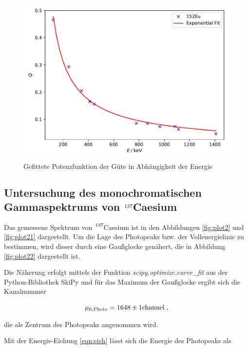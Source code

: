 \begin{figure}[H]
  \centering
  \includegraphics[scale=0.7]{content/plot6.pdf}
  \caption{Gefittete Potenzfunktion der Güte in Abhängigkeit der Energie}
  \label{fig:plot6}
\end{figure}


\subsection{Untersuchung des monochromatischen Gammaspektrums von $\ce{^{137}}$Caesium}

Das gemessene Spektrum von $\ce{^{137}}$Caesium ist in den Abbildungen \ref{fig:plot2} und \ref{fig:plot21} dargestellt.
Um die Lage des Photopeaks bzw. der Vollenergielinie zu bestimmen, wird dieser durch eine Gaußglocke genähert, die in Abbildung
\ref{fig:plot22} dargestellt ist.

Die Näherung erfolgt mittels der Funktion \textit{scipy.optimize.curve\_fit} aus der Python-Bibliothek SkiPy und für
das Maximum der Gaußglocke ergibt sich die Kanalnummer

\begin{equation*}
  \mu_{0,\text{Photo}} = \num{1648 +- 1} \text{channel}\; ,
\end{equation*}

die als Zentrum des Photopeaks angenommen wird.

Mit der Energie-Eichung \eqref{eqn:eich} lässt sich die Energie des Photopeaks als

